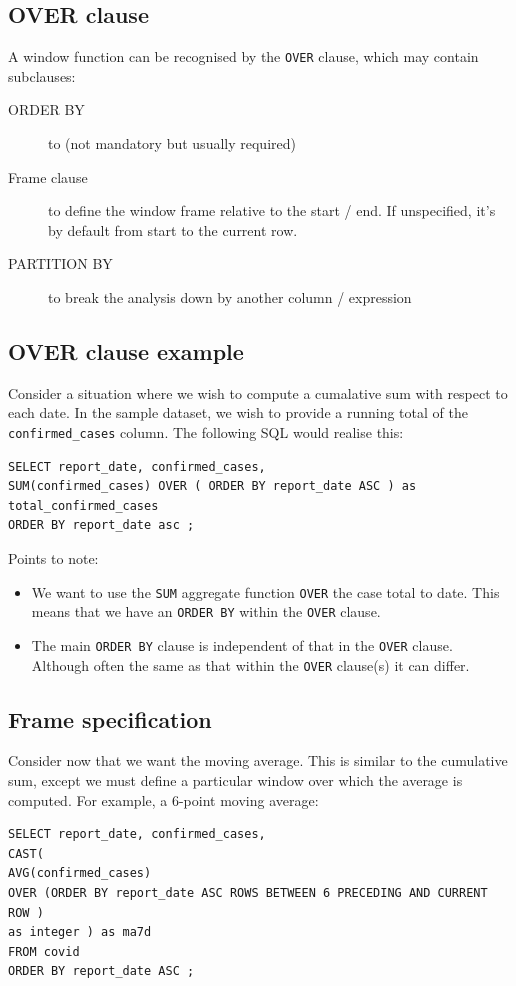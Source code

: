 \documentclass[slides]{pgnotes}
\begin{document}
\subsection{OVER clause}

A window function can be recognised by the \texttt{OVER} clause, which may contain subclauses:
\begin{description}
\item[ORDER BY] to  (not mandatory but usually required)
\item[Frame clause] to define the window frame relative to the start / end.  If unspecified, it's by default from start to the current row.
\item[PARTITION BY] to break the analysis down by another column / expression
\end{description}

\subsection{OVER clause example}

Consider a situation where we wish to compute a cumalative sum with respect to each date.
In the sample dataset, we wish to provide a running total of the \texttt{confirmed\_cases} column.
The following SQL would realise this: 

\begin{verbatim}
SELECT report_date, confirmed_cases,
SUM(confirmed_cases) OVER ( ORDER BY report_date ASC ) as total_confirmed_cases
ORDER BY report_date asc ;
\end{verbatim}
Points to note:
\begin{itemize}
\item
  We want to use the \texttt{SUM} aggregate function \texttt{OVER} the case total to date.
  This means that we have an \texttt{ORDER BY} within the \texttt{OVER} clause.
\item 
  The main \texttt{ORDER BY} clause is independent of that in the \texttt{OVER} clause.
  Although often the same as that within the \texttt{OVER} clause(s) it can differ.
\end{itemize}

\subsection{Frame specification}

Consider now that we want the moving average.
This is similar to the cumulative sum, except we must define a particular window over which the average is computed.
For example, a 6-point moving average: 
\begin{verbatim}
SELECT report_date, confirmed_cases, 
CAST(
AVG(confirmed_cases) 
OVER (ORDER BY report_date ASC ROWS BETWEEN 6 PRECEDING AND CURRENT ROW ) 
as integer ) as ma7d
FROM covid
ORDER BY report_date ASC ;
\end{verbatim}
\end{document}
